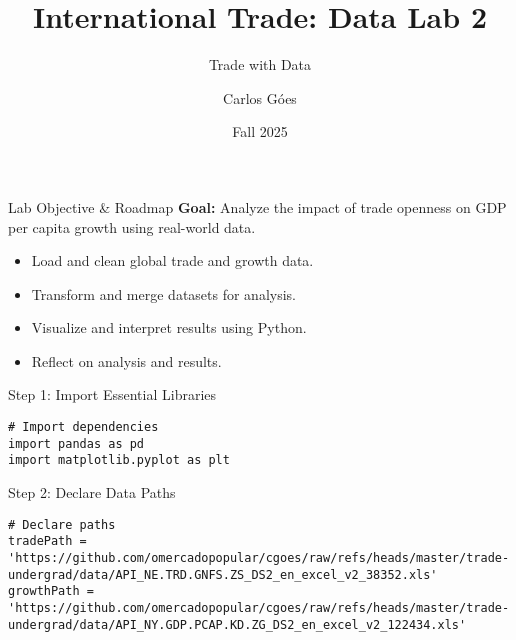 \documentclass[notes,11pt, aspectratio=169, xcolor=table]{beamer}
\title[]{International Trade: Data Lab 2}
\subtitle[]{Trade with Data}
\author[Góes]
{Carlos Góes\inst{1}}
\date{Fall 2025}
\institute[GWU]{\inst{1} George Washington University }
\begin{document}
\begin{frame}{Lab Objective & Roadmap}
\textbf{Goal:} Analyze the impact of trade openness on GDP per capita growth using real-world data.
\begin{itemize}
    \item Load and clean global trade and growth data.
    \item Transform and merge datasets for analysis.
    \item Visualize and interpret results using Python.
    \item Reflect on analysis and results.
\end{itemize}
\end{frame}

\begin{frame}[fragile]{Step 1: Import Essential Libraries}
\begin{verbatim}
# Import dependencies
import pandas as pd
import matplotlib.pyplot as plt
\end{verbatim}
\end{frame}

\begin{frame}[fragile]{Step 2: Declare Data Paths}
\begin{verbatim}
# Declare paths
tradePath = 'https://github.com/omercadopopular/cgoes/raw/refs/heads/master/trade-undergrad/data/API_NE.TRD.GNFS.ZS_DS2_en_excel_v2_38352.xls'
growthPath = 'https://github.com/omercadopopular/cgoes/raw/refs/heads/master/trade-undergrad/data/API_NY.GDP.PCAP.KD.ZG_DS2_en_excel_v2_122434.xls'
\end{verbatim}
\end{frame}
\end{document}
